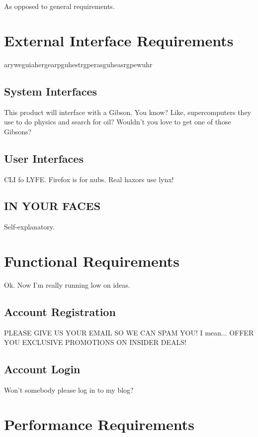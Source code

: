 \documentclass{scrreprt}
\begin{document}
As opposed to general requirements.

\section{External Interface Requirements}

aryweguiahergearpguhestrgperasguheasrgpewuhr

\subsection{System Interfaces}

This product will interface with a Gibson. You know? Like, supercomputers 
they use to do physics and search for oil? Wouldn't you love to get one of 
those Gibsons?

\subsection{User Interfaces}

CLI fo LYFE. Firefox is for nubs. Real haxors use lynx!

\subsection{IN YOUR FACES}

Self-explanatory.

\section{Functional Requirements}

Ok. Now I'm really running low on ideas.

\subsection{Account Registration}

PLEASE GIVE US YOUR EMAIL SO WE CAN SPAM YOU! I mean... 
OFFER YOU EXCLUSIVE PROMOTIONS ON INSIDER DEALS!

\subsection{Account Login}

Won't somebody please log in to my blog?

\section{Performance Requirements}
\end{document}
